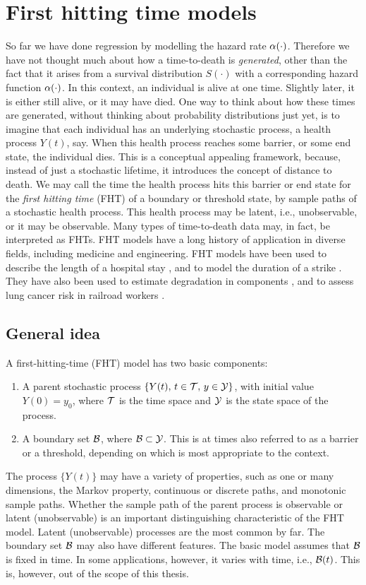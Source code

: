 \section{First hitting time models}\label{sec:FHT}
So far we have done regression by modelling the hazard rate $\alpha(\cdot)$.
Therefore we have not thought much about how a time-to-death is \textit{generated}, other than the fact that it arises from a survival distribution $S(\cdot)$ with a corresponding hazard function $\alpha(\cdot)$.
In this context, an individual is alive at one time. Slightly later, it is either still alive, or it may have died.
One way to think about how these times are generated, without thinking about probability distributions just yet, is to imagine that each 
individual has an underlying stochastic process, a health process $Y(t)$, say. When this health process reaches some barrier, or some end state, the individual dies. This is a conceptual appealing framework, because, instead of just a stochastic lifetime, it introduces
the concept of distance to death. We may call the time the health process hits this barrier or end state for the \textit{first hitting time} (FHT)
of a boundary or threshold state, by sample paths of a stochastic health process. This health process may be latent, i.e., unobservable,
or it may be observable.
Many types of time-to-death data may, in fact, be interpreted as FHTs.
FHT models have a long history of application in diverse fields, including medicine and engineering. FHT models have been used to describe the length of a hospital stay \citep{whitmore1975,eaton-whitmore}, and to model the duration of a strike \citep{lancaster}. They have also been used to estimate degradation in components \citep{whitmore1995}, and to assess lung cancer risk in railroad workers \citep{leewhitmore2004}.

\subsection{General idea}\label{fht-idea}
A first-hitting-time (FHT) model has two basic components:
\begin{enumerate}
\item A parent stochastic process $\{Y(t),\,t\in\mathcal{T},\,y\in\mathcal{Y}\}$, with initial value $Y(0)=y_0$, where $\mathcal{T}$ is the time space and $\mathcal{Y}$ is the state space of the process.
\item A boundary set $\mathcal{B}$, where $\mathcal{B}\subset\mathcal{Y}$. This is at times also referred to as a barrier or a threshold, depending on which is most appropriate to the context.
\end{enumerate}
The process $\{Y(t)\}$ may have a variety of properties, such as one or many dimensions, the Markov property, continuous or discrete paths, and monotonic sample paths. Whether the sample path of the parent process is observable or latent (unobservable) is an important distinguishing characteristic of the FHT model. Latent (unobservable) processes are the most common by far. The boundary set $\mathcal{B}$ may also have different features. The basic model assumes that $\mathcal{B}$ is fixed in time. In some applications, however, it varies with time, i.e., $\mathcal{B}(t)$. This is, however, out of the scope of this thesis.

